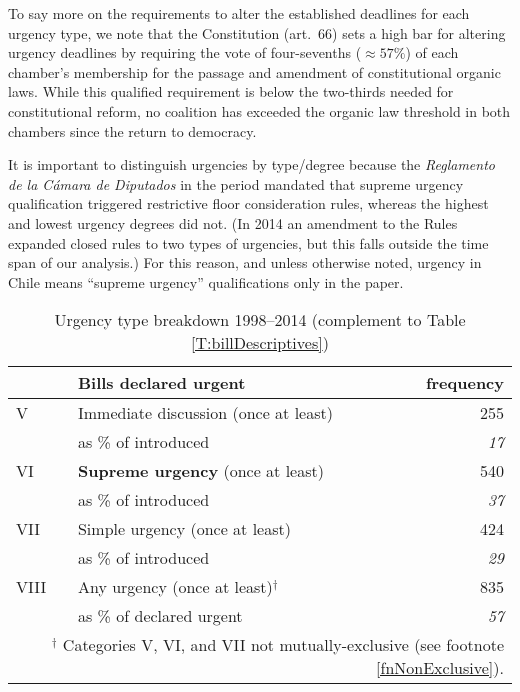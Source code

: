 \documentclass[letter,12pt]{article}
\begin{document}
To say more on the requirements to alter the established deadlines for each urgency type, we note that the Constitution (art.~66) sets a high bar for altering urgency deadlines by requiring the vote of four-sevenths ($\approx 57\%$) of each chamber's membership for the passage and amendment of constitutional organic laws. While this qualified requirement is below the two-thirds needed for constitutional reform, no coalition has exceeded the organic law threshold in both chambers since the return to democracy. 

It is important to distinguish urgencies by type/degree because the \emph{Reglamento de la C\'amara de Diputados} in the period mandated that supreme urgency qualification triggered restrictive floor consideration rules, whereas the highest and lowest urgency degrees did not. (In 2014 an amendment to the Rules expanded closed rules to two types of urgencies, but this falls outside the time span of our analysis.) For this reason, and unless otherwise noted, urgency in Chile means ``supreme urgency'' qualifications only in the paper. 

\begin{table}
\centering
\caption{Urgency type breakdown 1998--2014 (complement to Table \ref{T:billDescriptives})}\label{T:billDescriptivesPartB}
\begin{tabular}{llr}
    & Bills declared urgent                        &  frequency   \\ \hline
V   & Immediate discussion (once at least)         &         255  \\
    & as \% of introduced                          &   \emph{17}  \\ \hdashline
VI  & \textbf{Supreme urgency} (once at least)     &         540  \\
    & as \% of introduced                          &   \emph{37}  \\ \hdashline
VII & Simple urgency (once at least)               &         424  \\
    & as \% of introduced                          &   \emph{29}  \\ \hdashline
VIII& Any urgency (once at least)$^\dagger$          &         835  \\
    & as \% of declared urgent                     &   \emph{57}  \\
\hline
\multicolumn{3}{r}{\footnotesize{$^\dagger$ Categories V, VI, and VII not mutually-exclusive (see footnote \ref{fnNonExclusive}).}} \\
\end{tabular}
\end{table}
\end{document}
